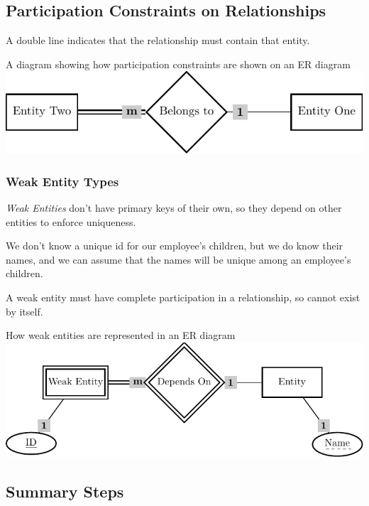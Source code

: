 \subsection{Participation Constraints on Relationships}\label{sub:participation_constraints_on_relationships}

A double line indicates that the relationship must contain that entity.

\begin{highlight}{A diagram showing how participation constraints are shown on an ER diagram}
    \includegraphics{lualatex/dsr/3/mandatoryrelationships.pdf}
\end{highlight}

\subsubsection{Weak Entity Types}\label{ssub:weak_entity_types}

\emph{Weak Entities} don't have primary keys of their own, so they depend on other entities to enforce uniqueness.

We don't know a unique id for our employee's children, but we do know their names, and we can assume that the names will be unique among an employee's children.

A weak entity must have complete participation in a relationship, so cannot exist by itself.

\begin{highlight}{How weak entities are represented in an ER diagram}
    \includegraphics{lualatex/dsr/3/weakentities.pdf}
\end{highlight}

\subsection{Summary Steps}\label{sub:summary_steps}

